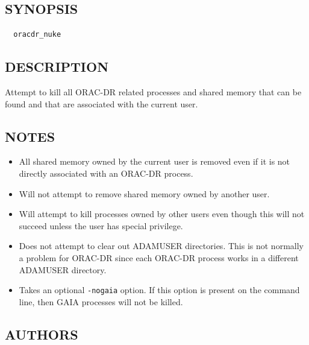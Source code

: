 \documentclass[twoside,11pt]{article}
\renewcommand{\_}{\texttt{\symbol{95}}}
\begin{document}
\subsection*{SYNOPSIS\label{oracdr_nuke_SYNOPSIS}}
\begin{verbatim}
  oracdr_nuke
\end{verbatim}
\subsection*{DESCRIPTION\label{oracdr_nuke_DESCRIPTION}}


Attempt to kill all ORAC-DR related processes and shared memory that
can be found and that are associated with the current user.

\subsection*{NOTES\label{oracdr_nuke_NOTES}}
\begin{itemize}

\item

All shared memory owned by the current user is removed even if
it is not directly associated with an ORAC-DR process.


\item

Will not attempt to remove shared memory owned by another user.


\item

Will attempt to kill processes owned by other users even though
this will not succeed unless the user has special privilege.


\item

Does not attempt to clear out ADAM\_USER directories. This is not
normally a problem for ORAC-DR since each ORAC-DR process works
in a different ADAM\_USER directory.


\item 

Takes an optional \texttt{-nogaia} option. If this option is present on the
command line, then GAIA processes will not be killed.

\end{itemize}
\subsection*{AUTHORS\label{oracdr_nuke_AUTHORS}}
\end{document}

